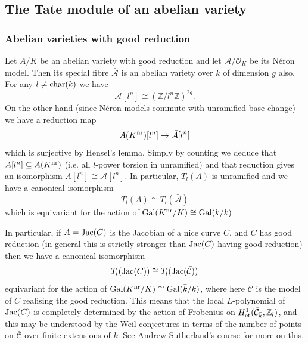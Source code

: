 \documentclass[12pt]{amsart}
\numberwithin{equation}{section}
\theoremstyle{remark}
\theoremstyle{definition}
\theoremstyle{definition}
\theoremstyle{definition}
\theoremstyle{definition}
\theoremstyle{definition}
\theoremstyle{definition}
\begin{document}
\subsection{The Tate module of an abelian variety}

\subsubsection{Abelian varieties with good reduction}

Let $A/K$ be an abelian variety with good reduction and let $\mathcal{A}/\mathcal{O}_K$ be its N\'{e}ron model. Then its special fibre $\bar{\mathcal{A}}$ is an abelian variety over $k$ of dimension $g$ also. For any $l\neq \textup{char}(k)$ we have
\[\bar{\mathcal{A}}[l^n]\cong (\mathbb{Z}/l^n\mathbb{Z})^{2g}.\]
On the other hand (since N\'{e}ron models commute with unramified base change) we have a reduction map
\[A(K^\textup{nr})[l^n]\rightarrow \bar{\mathcal{A}}[l^n]\]
which is surjective by Hensel's lemma. Simply by counting we deduce that $A[l^n]\subseteq A(K^\textup{nr})$ (i.e. all $l$-power torsion in unramified) and that reduction gives an isomorphism $A[l^n]\cong \bar{\mathcal{A}}[l^n]$. In particular, $T_l(A)$ is unramified and we have a canonical isomorphism
\begin{equation} \label{tate module red 1}
 T_l(A)\cong T_l(\bar{\mathcal{A}})
\end{equation}
which is equivariant for the action of $\textup{Gal}(K^\textup{nr}/K)\cong \textup{Gal}(\bar{k}/k)$. 

In particular, if $A=\textup{Jac}(C)$ is the Jacobian of a nice curve $C$, and $C$ has good reduction (in general this is strictly stronger than $\textup{Jac}(C)$ having good reduction) then we have a canonical isomorphism
\begin{equation} \label{jac tate module}
 T_l(\textup{Jac}(C))\cong T_l(\textup{Jac}(\bar{\mathcal{C}})) 
\end{equation}
equivariant for the action of $\textup{Gal}(K^\textup{nr}/K)\cong \textup{Gal}(\bar{k}/k)$, where here $\mathcal{C}$ is the model of $C$ realising the good reduction. This means that the local $L$-polynomial of $\textup{Jac}(C)$ is completely determined by the action of Frobenius on $H^1_{\textup{et}}(\bar{\mathcal{C}}_{\bar{k}},\mathbb{Z}_l)$, and this may be understood by the Weil conjectures in terms of the number of points on $\bar{\mathcal{C}}$ over finite extensions of $k$. See Andrew Sutherland's course for more on this.
\end{document}
